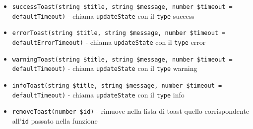 \documentclass[a4paper,10pt]{article}
\begin{document}
\begin{itemize}
    \item \texttt{successToast(string \$title, string \$message, number \$timeout = defaultTimeout)} - chiama \texttt{updateState} con il \texttt{type} success
    \item \texttt{errorToast(string \$title, string \$message, number \$timeout = defaultErrorTimeout)} - chiama \texttt{updateState} con il \texttt{type} error
    \item \texttt{warningToast(string \$title, string \$message, number \$timeout = defaultTimeout)} - chiama \texttt{updateState} con il \texttt{type} warning
    \item \texttt{infoToast(string \$title, string \$message, number \$timeout = defaultTimeout)} - chiama \texttt{updateState} con il \texttt{type} info
    \item \texttt{removeToast(number \$id)} - rimuove nella lista di toast quello corrispondente all'\texttt{id} passato nella funzione
\end{itemize}
\end{document}
